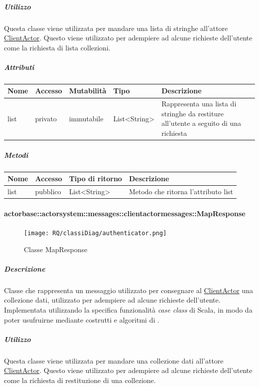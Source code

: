 \documentclass{scalatekids-article}
\begin{document}
\subparagraph{Utilizzo}
Questa classe viene utilizzata per mandare una lista di stringhe all'attore
\hyperref[sec:actorbase::actorsystem::actors::clientactor::ClientActor]{ClientActor}.
Questo viene utilizzato per adempiere ad alcune richieste dell'utente come
la richiesta di lista collezioni.

\subparagraph{Attributi}
\begin{tabular}{| p{2cm} | p{1.5cm} | p{2cm} | p{3cm} | p{8.5cm} |}
  \hline
  Nome & Accesso & Mutabilità & Tipo & Descrizione\\
  \hline
  list & privato & immutabile & List<String> & Rappresenta una lista di stringhe da restiture all'utente a seguito di una richiesta \\
  \hline
\end{tabular}

\subparagraph{Metodi}
\begin{tabular}{| l | l | l | l |}
  \hline
  Nome & Accesso & Tipo di ritorno & Descrizione\\
  \hline
  list & pubblico & List<String> & Metodo che ritorna l'attributo list\\
  \hline
\end{tabular}

\paragraph{actorbase::actorsystem::messages::clientactormessages::MapResponse}
\label{sec:actorbase::actorsystem::messages::clientactormessages::MapResponse}

\begin{figure}[H]
  \begin{center}
    \texttt{[image: RQ/classiDiag/authenticator.png]}
    \caption{Classe MapResponse}
  \end{center}
\end{figure}

\subparagraph{Descrizione}
Classe che rappresenta un messaggio utilizzato per consegnare al
\hyperref[sec:actorbase::actorsystem::actors::clientactor::ClientActor]{ClientActor} una collezione dati, utilizzato per adempiere ad alcune
richieste dell'utente.\\Implementata utilizzando la specifica funzionalità \textit{case class} di Scala,
in modo da poter usufruirne mediante costrutti e algoritmi di
.

\subparagraph{Utilizzo}
Questa classe viene utilizzata per mandare una collezione dati all'attore
\hyperref[sec:actorbase::actorsystem::actors::clientactor::ClientActor]{ClientActor}.
Questo viene utilizzato per adempiere ad alcune richieste dell'utente come
la richiesta di restituzione di una collezione.
\end{document}
